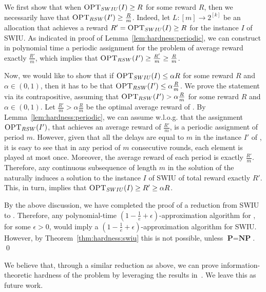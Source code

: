 We first show that when $\textsc{OPT}_{SWIU}(I) \geq R$ for some reward $R$, then we necessarily have that $\textsc{OPT}_{{RSW}}(I') \geq \frac{R}{m}$. Indeed, let $L:[m] \rightarrow 2^{[k]}$ be an allocation that achieves a reward $R' = \textsc{OPT}_{SWIU}(I) \geq R$ for the instance $I$ of SWIU. As indicated in proof of Lemma~\ref{lem:hardness:periodic}, we can construct in polynomial time a periodic assignment for the \rsm problem of average reward exactly $\frac{R'}{m}$, which implies that $\textsc{OPT}_{{RSW}}(I') \geq \frac{R'}{m} \geq \frac{R}{m}$.

Now, we would like to show that if $\textsc{OPT}_{SWIU}(I) \leq \alpha R$ for some reward $R$ and $\alpha \in (0,1)$, then it has to be that $\textsc{OPT}_{{RSW}}(I') \leq \alpha \frac{R}{m}$. We prove the statement via its contrapositive, assuming that $\textsc{OPT}_{{RSW}}(I') > \alpha \frac{R}{m}$ for some reward $R$ and $\alpha \in (0,1)$. Let $\frac{R'}{m}> \alpha \frac{R}{m}$ be the optimal average reward of \rsm. By Lemma~\ref{lem:hardness:periodic}, we can assume w.l.o.g. that the assignment $\textsc{OPT}_{{RSW}}(I')$, that achieves an average reward of $\frac{R'}{m}$, is a periodic assignment of period $m$. However, given that all the delays are equal to $m$ in the instance $I'$ of \rsm, it is easy to see that in any period of $m$ consecutive rounds, each element is played at most once. Moreover, the average reward of each period is exactly $\frac{R'}{m}$. Therefore, any continuous subsequence of length $m$ in the solution of the \rsm naturally induces a solution to the instance $I$ of SWIU of total reward exactly $R'$. This, in turn, implies that $\textsc{OPT}_{SWIU}(I) \geq R' \geq \alpha R$.

By the above discussion, we have completed the proof of a reduction from SWIU to \rsm. Therefore, any polynomial-time $\left(1 - \frac{1}{e} + \epsilon\right)$-approximation algorithm for \rsm, for some $\epsilon>0$, would imply a $\left(1 - \frac{1}{e} + \epsilon\right)$-approximation algorithm for SWIU. However, by Theorem~\ref{thm:hardness:swiu} this is not possible, unless $\textbf{P} = \textbf{NP}$.
\qed
\newline

We believe that, through a similar reduction as above, we can prove information-theoretic hardness of the \rsm problem by leveraging the results in~\cite{MSV08}. We leave this as future work.